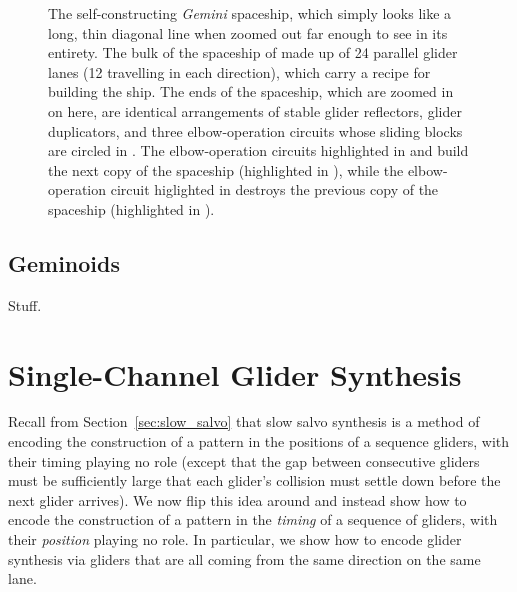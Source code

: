 \begin{figure}[!htbp]
	\centering
	\caption{The self-constructing \emph{Gemini} spaceship, which simply looks like a long, thin diagonal line when zoomed out far enough to see in its entirety. The bulk of the spaceship of made up of 24 parallel glider lanes (12 travelling in each direction), which carry a recipe for building the ship. The ends of the spaceship, which are zoomed in on here, are identical arrangements of stable glider reflectors, glider duplicators, and three elbow-operation circuits whose sliding blocks are circled in . The elbow-operation circuits highlighted in  and  build the next copy of the spaceship (highlighted in ), while the elbow-operation circuit higlighted in  destroys the previous copy of the spaceship (highlighted in ).}\label{fig:gemini}
\end{figure}


\subsection{Geminoids}\label{sec:geminoids}

Stuff.



\section{Single-Channel Glider Synthesis}\label{sec:single_channel_synth}

Recall from Section~\ref{sec:slow_salvo} that slow salvo synthesis is a method of encoding the construction of a pattern in the positions of a sequence gliders, with their timing playing no role (except that the gap between consecutive gliders must be sufficiently large that each glider's collision must settle down before the next glider arrives). We now flip this idea around and instead show how to encode the construction of a pattern in the \emph{timing} of a sequence of gliders, with their \emph{position} playing no role. In particular, we show how to encode glider synthesis via gliders that are all coming from the same direction on the same lane.

